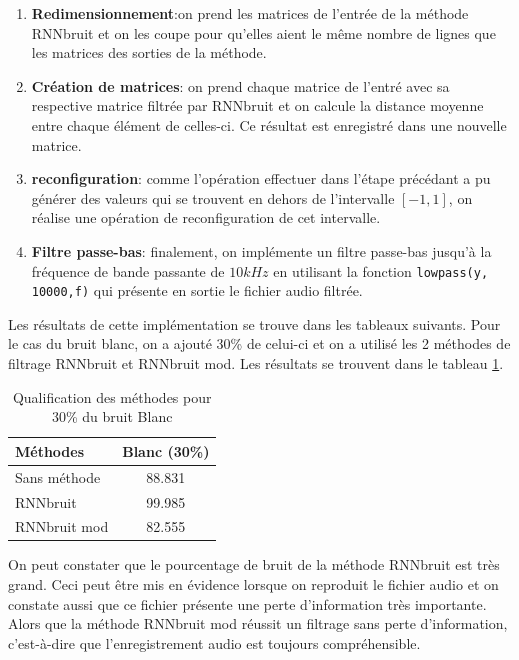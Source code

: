 \documentclass[conference,onecolumn]{IEEEtran}
\begin{document}
\begin{enumerate} %
    \item \textbf{Redimensionnement}:on prend les matrices de l’entrée de la méthode RNNbruit et on les coupe pour qu’elles aient le même nombre de lignes que les matrices des sorties de la méthode.
 
    
    \item \textbf{Création de matrices}: on prend chaque matrice de l’entré avec sa respective matrice filtrée par RNNbruit et on calcule la distance moyenne entre chaque élément de celles-ci. Ce résultat est enregistré dans une nouvelle matrice.
 
    
    \item \textbf{reconfiguration}: comme l’opération effectuer dans l’étape précédant a pu générer des valeurs qui se trouvent en dehors de l’intervalle $[-1,1]$, on réalise une opération de reconfiguration de cet intervalle.
    
    \item \textbf{Filtre passe-bas}: finalement, on implémente un filtre passe-bas jusqu’à la fréquence de bande passante de $10 kHz$ en utilisant la fonction \texttt{lowpass(y, 10000,f)} qui présente en sortie le fichier audio filtrée.
\end{enumerate}

Les résultats de cette implémentation se trouve dans les tableaux suivants. Pour le cas du bruit blanc, on a ajouté 30\% de celui-ci et on a utilisé les 2 méthodes de filtrage RNNbruit et RNNbruit mod. Les résultats se trouvent dans le tableau \ref{table:t10}.

\begin{table}[hbt!]
    \centering
    \begin{tabular}{ l  c }
    \textbf{Méthodes} & \textbf{Blanc (30\%)} \\
    \hline
    Sans méthode &  88.831\\
    RNNbruit &  99.985\\
    RNNbruit mod &  82.555\\
    \end{tabular}
    \caption{Qualification des méthodes pour 30\% du bruit Blanc}
    \label{table:t10}
\end{table}
On peut constater que le pourcentage de bruit de la méthode RNNbruit est très grand. Ceci peut être mis en  évidence lorsque on reproduit le fichier audio et on constate aussi que ce fichier présente une perte d’information très importante. Alors que la méthode RNNbruit mod réussit un filtrage sans perte d’information, c’est-à-dire que l’enregistrement audio est toujours compréhensible.
\end{document}
